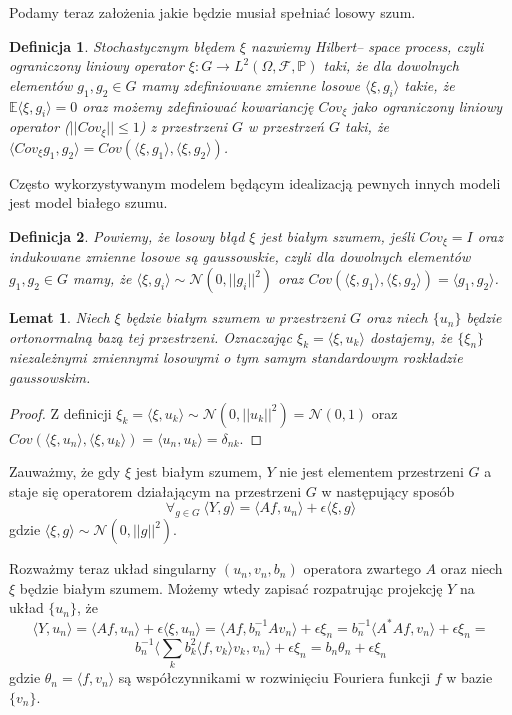 \documentclass[12pt]{article}
\newtheorem{df}{Definicja}
\newtheorem{lm}{Lemat}
\begin{document}
Podamy teraz założenia jakie będzie musiał spełniać losowy szum. 

\begin{df}
Stochastycznym błędem $\xi$ nazwiemy Hilbert-- space process, czyli ograniczony liniowy operator $\xi\colon G\to L^2(\Omega, \mathcal{F},\mathbb{P})$ taki, że dla dowolnych elementów $g_1,g_2\in G$ mamy zdefiniowane zmienne losowe $\langle \xi, g_i\rangle$ takie, że $\mathbb{E}\langle \xi, g_i\rangle =0$ oraz możemy zdefiniować kowariancję $Cov_{\xi}$ jako ograniczony liniowy operator ($||Cov_{\xi}||\leq 1$) z przestrzeni $G$ w przestrzeń $G$ taki, że $ \langle Cov_{\xi}g_1,g_2\rangle=Cov(\langle \xi,g_1\rangle,\langle \xi,g_2\rangle)$.
\end{df}

Często wykorzystywanym modelem będącym idealizacją pewnych innych modeli jest model białego szumu.
\begin{df}
Powiemy, że losowy błąd $\xi$ jest białym szumem, jeśli $Cov_{\xi}=I$ oraz indukowane zmienne losowe są gaussowskie, czyli dla dowolnych elementów $g_1,g_2\in G$ mamy, że $\langle \xi,g_i\rangle\sim \mathcal{N}(0,||g_i||^2)$ oraz $Cov(\langle \xi,g_1\rangle , \langle \xi , g_2\rangle)=\langle g_1, g_2\rangle$.
\end{df}
\begin{lm}
Niech $\xi$ będzie białym szumem w przestrzeni $G$ oraz niech $\{u_n\}$ będzie ortonormalną bazą tej przestrzeni. Oznaczając $\xi_k=\langle \xi,u_k\rangle$ dostajemy, że $\{\xi_n\}$ niezależnymi zmiennymi losowymi o tym samym standardowym rozkładzie gaussowskim.
\end{lm}
\begin{proof}
Z definicji $\xi_k=\langle \xi,u_k\rangle\sim \mathcal{N}(0,||u_k||^2)=\mathcal{N}(0,1)$ oraz $Cov(\langle \xi, u_n\rangle,\langle \xi, u_k\rangle)=\langle u_n,u_k\rangle=\delta_{nk}$.
\end{proof}

Zauważmy, że gdy $\xi$ jest białym szumem, $Y$ nie jest elementem przestrzeni $G$ a staje się operatorem działającym na przestrzeni $G$ w następujący sposób
\begin{displaymath}
\forall_{g\in G}\ \langle Y,g\rangle =\langle Af,u_n\rangle + \epsilon\langle \xi, g\rangle
\end{displaymath}
gdzie $\langle \xi, g\rangle\sim\mathcal{N}(0,||g||^2)$.

Rozważmy teraz układ singularny $(u_n,v_n,b_n)$ operatora zwartego $A$ oraz niech $\xi$ będzie białym szumem. Możemy wtedy zapisać rozpatrując projekcję $Y$ na układ $\{u_n\}$, że
\begin{displaymath}
\langle Y,u_n\rangle=\langle Af,u_n\rangle +\epsilon\langle \xi, u_n\rangle=\langle Af,b_n^{-1}Av_n\rangle+\epsilon \xi_n=b_n^{-1}\langle A^*Af, v_n\rangle+\epsilon \xi_n=
\end{displaymath}
\begin{displaymath}
b_n^{-1}\langle \sum_kb_k^2\langle f, v_k\rangle v_k, v_n\rangle +\epsilon\xi_n=b_n\theta_n+\epsilon\xi_n
\end{displaymath}
gdzie $\theta_n=\langle f,v_n\rangle$ są współczynnikami w rozwinięciu Fouriera funkcji $f$ w bazie $\{v_n\}$. 
\end{document}
